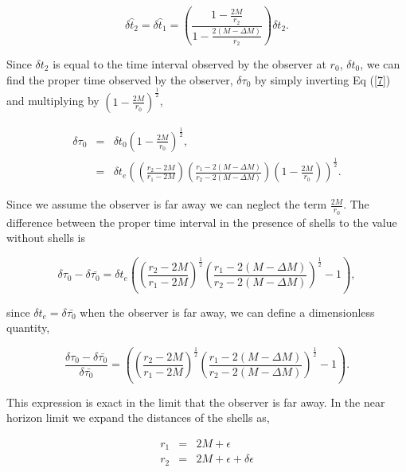 \documentclass[aps,showpacs,onecolumn,floats,prd,superscriptaddress,nofootinbib]{revtex4}
\begin{document}
\begin{equation}
	\delta \hat{t}_2 = \delta \hat{t}_1= \left( \frac{1 - \frac{2M}{r_2}}{1 - \frac{2(M- \Delta M)}{r_2}} \right) \delta t_2.	\label{7}
\end{equation}

Since $\delta t_2$ is equal to the time interval observed by the observer at $r_0$, $\delta t_0$, we can find the proper time observed by the observer, $\delta \tau_0$ by simply inverting Eq (\ref{7}) and multiplying by $ \left( 1 - \frac{2M}{r_0} \right)^\frac{1}{2}$, 

\begin{eqnarray}
	\delta \tau_0 & = & \delta t_0 \left( 1 - \frac{2M}{r_0} \right)^\frac{1}{2}, 	\nonumber	\\
	& =& \delta t_e \left( \left( \frac{r_2 - 2M}{r_1 - 2M} \right) \left( \frac{r_1 - 2(M-\Delta M)}{r_2 - 2(M - \Delta M)} \right) \left( 1 -\frac{2M}{r_0} \right) \right)^\frac{1}{2}. 
\end{eqnarray}

Since we assume the observer is far away we can neglect the term $\frac{2M}{r_0}$. The difference between the proper time interval in the presence of shells to the value without shells is 

\begin{equation}
	\delta \tau_0 - \delta \bar{\tau_0} = \delta t_e \left( \left( \frac{r_2 - 2M}{r_1 - 2M} \right)^\frac{1}{2} \left( \frac{r_1 - 2(M -\Delta M)}{r_2 - 2(M- \Delta M)} \right)^\frac{1}{2} - 1\right),
\end{equation}

since $\delta t_e = \delta \bar{\tau_0}$ when the observer is far away, we can define a dimensionless quantity, 

\begin{equation}
	\frac{\delta \tau_0 - \delta \bar{\tau_0}}{\delta \bar{\tau_0}} = \left( \left( \frac{r_2 - 2M}{r_1 - 2M} \right)^\frac{1}{2} \left( \frac{r_1 - 2(M-\Delta M)}{r_2 - 2(M-\Delta M)} \right)^\frac{1}{2} - 1\right).	\label{10}
\end{equation}

This expression is exact in the limit that the observer is far away. In the near horizon limit we expand the distances of the shells as,

\begin{eqnarray}
	r_1 & = & 2M + \epsilon 	\nonumber	\\
	 r_2 & = & 2M + \epsilon + \delta \epsilon 	\label{11'}
\end{eqnarray}
\end{document}
